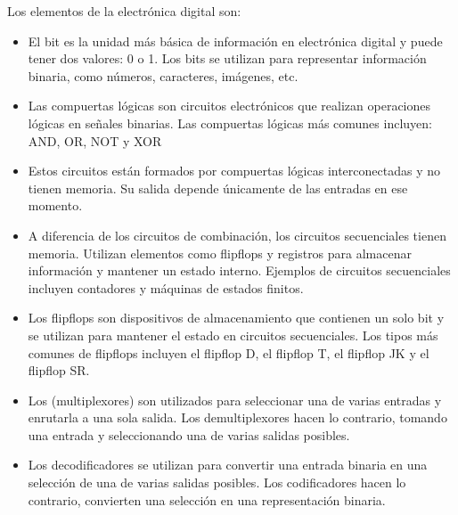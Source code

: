 \documentclass[letterpaper,10pt,spanish]{sphinxmanual}
\begin{document}
\sphinxAtStartPar
Los elementos de la electrónica digital son:
\begin{itemize}
\item {} 
\sphinxAtStartPar
{} El bit es la unidad más básica de información en electrónica digital y puede tener dos valores: 0 o 1. Los bits se utilizan para representar información binaria, como números, caracteres, imágenes, etc.

\item {} 
\sphinxAtStartPar
{} Las compuertas lógicas son circuitos electrónicos que realizan operaciones lógicas en señales binarias. Las compuertas lógicas más comunes incluyen: AND, OR, NOT y XOR

\item {} 
\sphinxAtStartPar
{} Estos circuitos están formados por compuertas lógicas interconectadas y no tienen memoria. Su salida depende únicamente de las entradas en ese momento.

\item {} 
\sphinxAtStartPar
{}   A diferencia de los circuitos de combinación, los circuitos secuenciales tienen memoria. Utilizan elementos como flip\sphinxhyphen{}flops y registros para almacenar información y mantener un estado interno. Ejemplos de circuitos secuenciales incluyen contadores y máquinas de estados finitos.

\item {} 
\sphinxAtStartPar
{} Los flip\sphinxhyphen{}flops son dispositivos de almacenamiento que contienen un solo bit y se utilizan para mantener el estado en circuitos secuenciales. Los tipos más comunes de flip\sphinxhyphen{}flops incluyen el flip\sphinxhyphen{}flop D, el flip\sphinxhyphen{}flop T, el flip\sphinxhyphen{}flop JK y el flip\sphinxhyphen{}flop SR.

\item {} 
\sphinxAtStartPar
{} Los (multi\sphinxhyphen{}plexores) son utilizados para seleccionar una de varias entradas y enrutarla a una sola salida. Los demultiplexores hacen lo contrario, tomando una entrada y seleccionando una de varias salidas posibles.

\item {} 
\sphinxAtStartPar
{} Los decodificadores se utilizan para convertir una entrada binaria en una selección de una de varias salidas posibles. Los codificadores hacen lo contrario, convierten una selección en una representación binaria.


\end{itemize}
\end{document}
